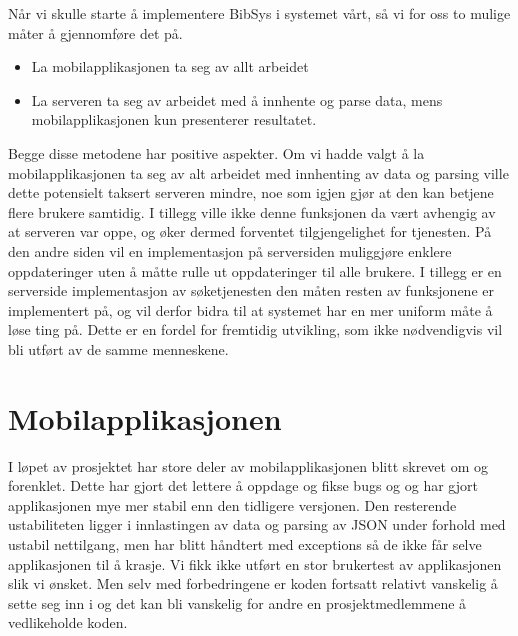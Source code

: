 \documentclass[../main.tex]{subfiles}
\begin{document}
Når vi skulle starte å implementere BibSys i systemet vårt, så vi for oss to mulige måter å gjennomføre det på.
\begin{itemize}
\item La mobilapplikasjonen ta seg av allt arbeidet
\item La serveren ta seg av arbeidet med å innhente og parse data, mens mobilapplikasjonen kun presenterer resultatet.
\end{itemize}
Begge disse metodene har positive aspekter. Om vi hadde valgt å la mobilapplikasjonen ta seg av alt arbeidet med innhenting av data og parsing ville dette potensielt taksert serveren mindre, noe som igjen gjør at den kan betjene flere brukere samtidig. I tillegg ville ikke denne funksjonen da vært avhengig av at serveren var oppe, og øker dermed forventet tilgjengelighet for tjenesten.
På den andre siden vil en implementasjon på serversiden muliggjøre enklere oppdateringer uten å måtte rulle ut oppdateringer til alle brukere. I tillegg er en serverside implementasjon av søketjenesten den måten resten av funksjonene er implementert på, og vil derfor bidra til at systemet har en mer uniform måte å løse ting på. Dette er en fordel for fremtidig utvikling, som ikke nødvendigvis vil bli utført av de samme menneskene.

\section{Mobilapplikasjonen}
I løpet av prosjektet har store deler av mobilapplikasjonen blitt skrevet om og forenklet. Dette har gjort det lettere å oppdage og fikse bugs og og har gjort applikasjonen mye mer stabil enn den tidligere versjonen. Den resterende ustabiliteten ligger i innlastingen av data og parsing av JSON under forhold med ustabil nettilgang, men har blitt håndtert med exceptions så de ikke får selve applikasjonen til å krasje. Vi fikk ikke utført en stor brukertest av applikasjonen slik vi ønsket. Men selv med forbedringene er koden fortsatt relativt vanskelig å sette seg inn i og det kan bli vanskelig for andre en prosjektmedlemmene å vedlikeholde koden.
\end{document}
